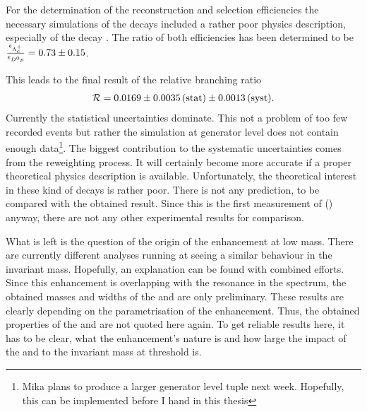 For the determination of the reconstruction and selection efficiencies the necessary simulations of the decays included a rather poor physics description, especially of the decay \LbToDpmunuX.
The ratio of both efficiencies has been determined to be $\frac{\epsilon_{{{\Lambda}^+_{c}}}}{\epsilon_{{{D}^0}{p}}} = 0.73 \pm 0.15$.

This leads to the final result of the relative branching ratio
\begin{align*}
    \mathcal{R} = 0.0169 \pm 0.0035\mathrm{\,(stat)} \pm 0.0013\mathrm{\,(syst)}.
\end{align*}
Currently the statistical uncertainties dominate.
This not a problem of too few recorded events but rather the \LbToDpmunuX simulation at generator level does not contain enough data\footnote{Mika plans to produce a larger generator level tuple next week. Hopefully, this can be implemented before I hand in this thesis}.
The biggest contribution to the systematic uncertainties comes from the reweighting process.
It will certainly become more accurate if a proper theoretical physics description is available.
Unfortunately, the theoretical interest in these kind of decays is rather poor.
There is not any prediction, to be compared with the obtained result.
Since this is the first measurement of \BR(\LbToDpmunuX) anyway, there are not any other experimental results for comparison.

What is left is the question of the origin of the enhancement at low \Dz\proton mass.
There are currently different analyses running at \lhcb seeing a similar behaviour in the invariant \Dz\proton mass.
Hopefully, an explanation can be found with combined efforts.
Since this enhancement is overlapping with the \LcResI resonance in the \Dz\proton spectrum, the obtained masses and widths of the \LcResI and \LcResII are only preliminary.
These results are clearly depending on the parametrisation of the enhancement.
Thus, the obtained properties of the \LcResI and \LcResII are not quoted here again.
To get reliable results here, it has to be clear, what the enhancement's nature is and how large the impact of the  and  to the invariant \Dz\proton mass at threshold is.
